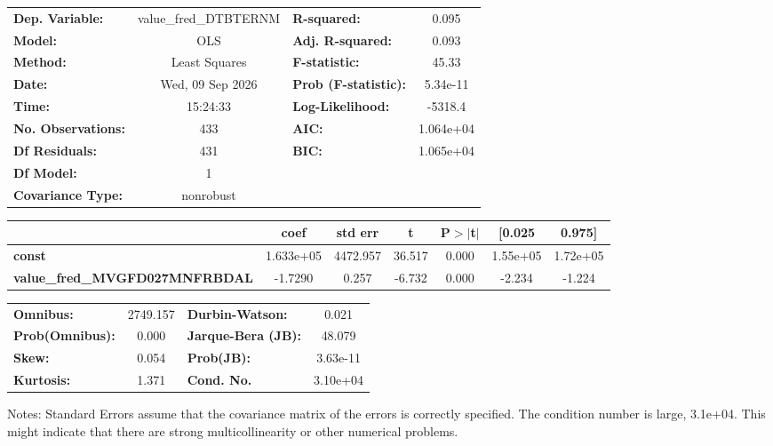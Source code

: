 \begin{center}
\begin{tabular}{lclc}
\toprule
\textbf{Dep. Variable:}                & value\_fred\_DTBTERNM & \textbf{  R-squared:         } &     0.095   \\
\textbf{Model:}                        &          OLS          & \textbf{  Adj. R-squared:    } &     0.093   \\
\textbf{Method:}                       &     Least Squares     & \textbf{  F-statistic:       } &     45.33   \\
\textbf{Date:}                         &    Wed, 09 Sep 2026   & \textbf{  Prob (F-statistic):} &  5.34e-11   \\
\textbf{Time:}                         &        15:24:33       & \textbf{  Log-Likelihood:    } &   -5318.4   \\
\textbf{No. Observations:}             &            433        & \textbf{  AIC:               } & 1.064e+04   \\
\textbf{Df Residuals:}                 &            431        & \textbf{  BIC:               } & 1.065e+04   \\
\textbf{Df Model:}                     &              1        & \textbf{                     } &             \\
\textbf{Covariance Type:}              &       nonrobust       & \textbf{                     } &             \\
\bottomrule
\end{tabular}
\begin{tabular}{lcccccc}
                                       & \textbf{coef} & \textbf{std err} & \textbf{t} & \textbf{P$> |$t$|$} & \textbf{[0.025} & \textbf{0.975]}  \\
\midrule
\textbf{const}                         &    1.633e+05  &     4472.957     &    36.517  &         0.000        &     1.55e+05    &     1.72e+05     \\
\textbf{value\_fred\_MVGFD027MNFRBDAL} &      -1.7290  &        0.257     &    -6.732  &         0.000        &       -2.234    &       -1.224     \\
\bottomrule
\end{tabular}
\begin{tabular}{lclc}
\textbf{Omnibus:}       & 2749.157 & \textbf{  Durbin-Watson:     } &    0.021  \\
\textbf{Prob(Omnibus):} &   0.000  & \textbf{  Jarque-Bera (JB):  } &   48.079  \\
\textbf{Skew:}          &   0.054  & \textbf{  Prob(JB):          } & 3.63e-11  \\
\textbf{Kurtosis:}      &   1.371  & \textbf{  Cond. No.          } & 3.10e+04  \\
\bottomrule
\end{tabular}
\end{center}

Notes: \newline
 [1] Standard Errors assume that the covariance matrix of the errors is correctly specified. \newline
 [2] The condition number is large, 3.1e+04. This might indicate that there are \newline
 strong multicollinearity or other numerical problems.